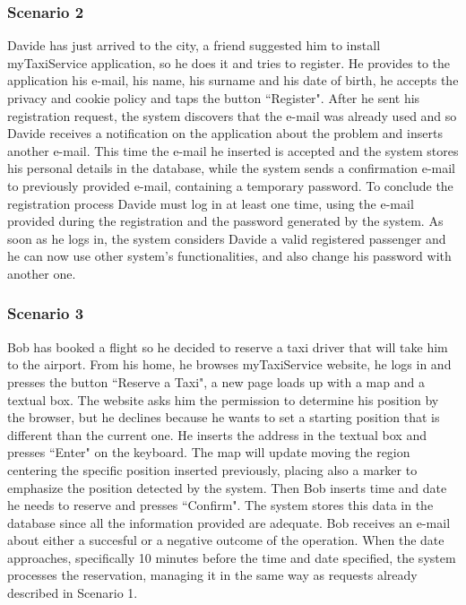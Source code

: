 \documentclass[a4paper,12pt]{article}%
\begin{document}
\subsubsection{Scenario 2}
Davide has just arrived to the city, a friend suggested him to install myTaxiService application, so he does it and tries to register.
He provides to the application his e-mail, his name, his surname and his date of birth, he accepts the privacy and cookie policy and taps the button ``Register". After he sent his registration request, the system discovers that the e-mail was already used and so Davide receives a notification on the application about the problem and inserts another e-mail.
This time the e-mail he inserted is accepted and the system stores his personal details in the database, while the system sends a confirmation e-mail to previously provided e-mail, containing a temporary password.
To conclude the registration process Davide must log in at least one time, using the e-mail provided during the registration and the password generated by the system.
As soon as he logs in, the system considers Davide a valid registered passenger and he can now use other system's functionalities, and also change his password with another one.  
\subsubsection{Scenario 3}
Bob has booked a flight so he decided to reserve a taxi driver that will take him to the airport.
From his home, he browses myTaxiService website, he logs in and presses the button ``Reserve a Taxi", a new page loads up with a map and a textual box.
The website asks him the permission to determine his position by the browser, but he declines because he wants to set a starting position that is different than the current one.
He inserts the address in the textual box and presses ``Enter" on the keyboard. The map will update moving the region centering the specific position inserted previously, placing also a marker to emphasize the position detected by the system.
Then Bob inserts time and date he needs to reserve and presses ``Confirm".
The system stores this data in the database since all the information provided are adequate. Bob receives an e-mail about either a succesful or a negative outcome of the operation.
When the date approaches, specifically 10 minutes before the time and date specified, the system processes the reservation, managing it in the same way as requests already described in Scenario 1. 
\end{document}
